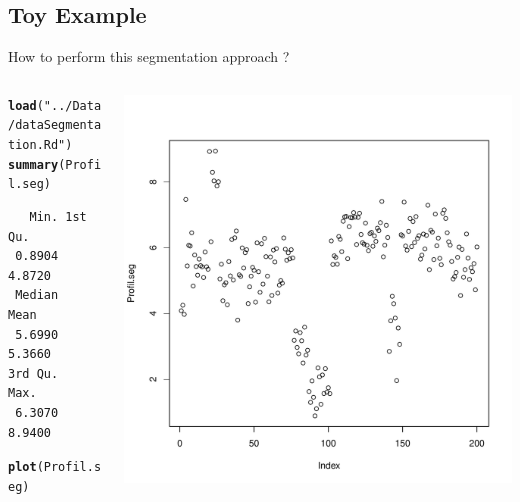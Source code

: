 \documentclass{beamer}\usepackage[]{graphicx}\usepackage[]{color}
\makeatletter
\newcommand{\hlstr}[1]{\textcolor[rgb]{0.192,0.494,0.8}{#1}}%
\newcommand{\hlstd}[1]{\textcolor[rgb]{0.345,0.345,0.345}{#1}}%
\newcommand{\hlkwd}[1]{\textcolor[rgb]{0.737,0.353,0.396}{\textbf{#1}}}%
\newenvironment{kframe}{%
 \def\at@end@of@kframe{}%
 \ifinner\ifhmode%
  \def\at@end@of@kframe{\end{minipage}}%
  \begin{minipage}{\columnwidth}%
 \fi\fi%
 \def\FrameCommand##1{\hskip\@totalleftmargin \hskip-\fboxsep
 \colorbox{shadecolor}{##1}\hskip-\fboxsep
     \hskip-\linewidth \hskip-\@totalleftmargin \hskip\columnwidth}%
 \MakeFramed {\advance\hsize-\width
   \@totalleftmargin\z@ \linewidth\hsize
   \@setminipage}}%
 {\par\unskip\endMakeFramed%
 \at@end@of@kframe}
\newenvironment{knitrout}{}{} %
\makeatother
\begin{document}
\subsection*{ Toy Example}
   \begin{frame}[fragile]{How to perform this segmentation approach ?}
 
\begin{columns}
\begin{column}{0.4\textwidth}
\begin{knitrout}\tiny
{}\color{fgcolor}\begin{kframe}
\begin{alltt}
\hlkwd{load}\hlstd{(}\hlstr{"../Data/dataSegmentation.Rd"}\hlstd{)}
\hlkwd{summary}\hlstd{(Profil.seg)}
\end{alltt}
\begin{verbatim}
   Min. 1st Qu. 
 0.8904  4.8720 
 Median    Mean 
 5.6990  5.3660 
3rd Qu.    Max. 
 6.3070  8.9400 
\end{verbatim}
\begin{alltt}
\hlkwd{plot}\hlstd{(Profil.seg)}
\end{alltt}
\end{kframe}
\end{knitrout}
\end{column}
\begin{column}{0.5\textwidth}
\includegraphics[scale=0.35]{segCode2-1.pdf}
\end{column}
\end{columns}
\end{frame}
\end{document}
